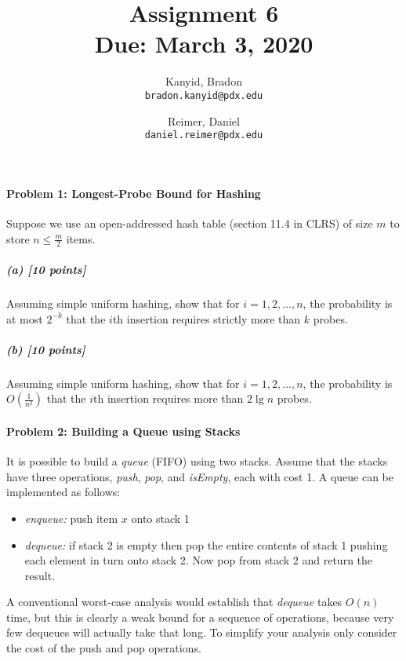 \documentclass[11pt]{article}
\title{\bf Assignment 6 \\[2ex]
\rm\normalsize Due: March 3, 2020}
\date{}
\author{
  Kanyid, Bradon\\
  \texttt{bradon.kanyid@pdx.edu}
  \and
  Reimer, Daniel\\
  \texttt{daniel.reimer@pdx.edu}
}
\begin{document}
\maketitle

\begin{center}
\end{center}

\paragraph{Problem 1: Longest-Probe Bound for Hashing}
Suppose we use an open-addressed hash table (section 11.4 in CLRS) of size $m$ to store $n \leq \frac m2$ items.

\subparagraph{(a) [10 points]}
Assuming simple uniform hashing, show that for $i = 1,2,...,n$, the probability is at most $2^{-k}$ that the $i$th
insertion requires strictly more than $k$ probes.



\subparagraph{(b) [10 points]}
Assuming simple uniform hashing, show that for $i = 1,2,...,n$, the probability is $O(\frac 1{n^2})$ that the
$i$th insertion requires more than $2 \lg n$ probes.



\paragraph{Problem 2: Building a Queue using Stacks}
It is possible to build a {\em queue} (FIFO) using two stacks. Assume that the stacks have three operations, {\em push}, {\em pop}, and {\em isEmpty}, each with cost 1. A queue can be implemented as follows:
\begin{itemize}
\item {\em enqueue:} push item $x$ onto stack 1
\item {\em dequeue:} if stack 2 is empty then pop the entire contents of stack 1 pushing each element in turn onto stack 2. Now pop from stack 2 and return the result.
\end{itemize}
A conventional worst-case analysis would establish that {\em dequeue} takes $O(n)$ time, but this is clearly a weak bound for a sequence of operations, because very few dequeues will actually take that long. To simplify your analysis only consider the cost of the push and pop operations.
\end{document}
